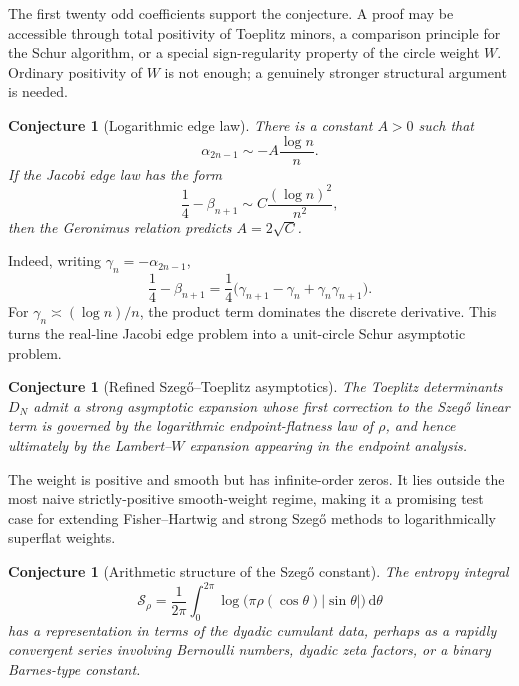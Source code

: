 \documentclass[11pt,oneside]{article}
\newtheorem{conjecture}[theorem]{Conjecture}
\theoremstyle{definition}
\newcommand{\dd}{\,\mathrm d}
\begin{document}
The first twenty odd coefficients support the conjecture. A proof may be accessible through
total positivity of Toeplitz minors, a comparison principle for the Schur algorithm, or a
special sign-regularity property of the circle weight \(W\). Ordinary positivity of \(W\) is
not enough; a genuinely stronger structural argument is needed.

\begin{conjecture}[Logarithmic edge law]
\label{p4:conj:alpha-asymptotic}
There is a constant \(A>0\) such that
\begin{equation}
 \alpha_{2n-1}\sim-A\frac{\log n}{n}.
 \label{p4:eq:alpha-asymptotic}
\end{equation}
If the Jacobi edge law has the form
\begin{equation}
 \frac14-\beta_{n+1}\sim C\frac{(\log n)^2}{n^2},
 \label{p4:eq:beta-edge-conj}
\end{equation}
then the Geronimus relation predicts \(A=2\sqrt C\).
\end{conjecture}

Indeed, writing \(\gamma_n=-\alpha_{2n-1}\),
\[
 \frac14-\beta_{n+1}
 =\frac14\bigl(\gamma_{n+1}-\gamma_n+\gamma_n\gamma_{n+1}\bigr).
\]
For \(\gamma_n\asymp(\log n)/n\), the product term dominates the discrete derivative.
This turns the real-line Jacobi edge problem into a unit-circle Schur asymptotic problem.

\begin{conjecture}[Refined Szeg\H{o}--Toeplitz asymptotics]
\label{p4:conj:Toeplitz}
The Toeplitz determinants \(D_N\) admit a strong asymptotic expansion whose first correction
to the Szeg\H{o} linear term is governed by the logarithmic endpoint-flatness law of
\(\rho\), and hence ultimately by the Lambert--\(W\) expansion appearing in the endpoint
analysis.
\end{conjecture}

The weight is positive and smooth but has infinite-order zeros. It lies outside the most
naive strictly-positive smooth-weight regime, making it a promising test case for extending
Fisher--Hartwig and strong Szeg\H{o} methods to logarithmically superflat weights.

\begin{conjecture}[Arithmetic structure of the Szeg\H{o} constant]
\label{p4:conj:Szego-constant}
The entropy integral
\begin{equation}
 \mathcal S_\rho=\frac1{2\pi}\int_0^{2\pi}
 \log\bigl(\pi\rho(\cos\theta)|\sin\theta|\bigr)\dd\theta
 \label{p4:eq:Szego-constant}
\end{equation}
has a representation in terms of the dyadic cumulant data, perhaps as a rapidly convergent
series involving Bernoulli numbers, dyadic zeta factors, or a binary Barnes-type constant.
\end{conjecture}
\end{document}
